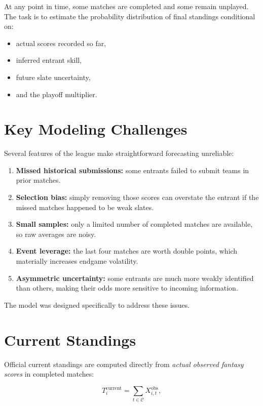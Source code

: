 \documentclass[11pt]{article}
\begin{document}
At any point in time, some matches are completed and some remain unplayed. The task is to estimate the probability distribution of final standings conditional on:
\begin{itemize}[itemsep=2pt]
    \item actual scores recorded so far,
    \item inferred entrant skill,
    \item future slate uncertainty,
    \item and the playoff multiplier.
\end{itemize}

\section{Key Modeling Challenges}

Several features of the league make straightforward forecasting unreliable:

\begin{enumerate}[itemsep=2pt]
    \item \textbf{Missed historical submissions:} some entrants failed to submit teams in prior matches.
    \item \textbf{Selection bias:} simply removing those scores can overstate the entrant if the missed matches happened to be weak slates.
    \item \textbf{Small samples:} only a limited number of completed matches are available, so raw averages are noisy.
    \item \textbf{Event leverage:} the last four matches are worth double points, which materially increases endgame volatility.
    \item \textbf{Asymmetric uncertainty:} some entrants are much more weakly identified than others, making their odds more sensitive to incoming information.
\end{enumerate}

The model was designed specifically to address these issues.

\section{Current Standings}

Official current standings are computed directly from \emph{actual observed fantasy scores} in completed matches:

\begin{equation}
T_i^{\text{current}} = \sum_{t \in \mathcal{C}} X_{i,t}^{\text{obs}},
\end{equation}
\end{document}
